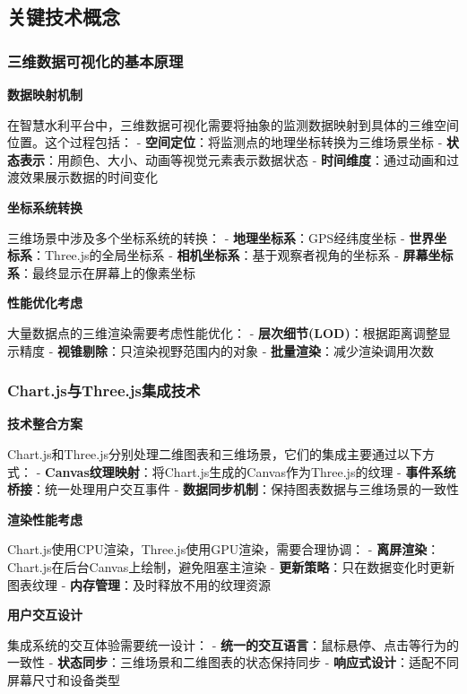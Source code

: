 \subsection{关键技术概念}\label{ux5173ux952eux6280ux672fux6982ux5ff5}

\subsubsection{三维数据可视化的基本原理}\label{ux4e09ux7ef4ux6570ux636eux53efux89c6ux5316ux7684ux57faux672cux539fux7406}

\textbf{数据映射机制}

在智慧水利平台中，三维数据可视化需要将抽象的监测数据映射到具体的三维空间位置。这个过程包括： - \textbf{空间定位}：将监测点的地理坐标转换为三维场景坐标 - \textbf{状态表示}：用颜色、大小、动画等视觉元素表示数据状态 - \textbf{时间维度}：通过动画和过渡效果展示数据的时间变化

\textbf{坐标系统转换}

三维场景中涉及多个坐标系统的转换： - \textbf{地理坐标系}：GPS经纬度坐标 - \textbf{世界坐标系}：Three.js的全局坐标系 - \textbf{相机坐标系}：基于观察者视角的坐标系 - \textbf{屏幕坐标系}：最终显示在屏幕上的像素坐标

\textbf{性能优化考虑}

大量数据点的三维渲染需要考虑性能优化： - \textbf{层次细节(LOD)}：根据距离调整显示精度 - \textbf{视锥剔除}：只渲染视野范围内的对象 - \textbf{批量渲染}：减少渲染调用次数

\subsubsection{Chart.js与Three.js集成技术}\label{chart.jsux4e0ethree.jsux96c6ux6210ux6280ux672f}

\textbf{技术整合方案}

Chart.js和Three.js分别处理二维图表和三维场景，它们的集成主要通过以下方式： - \textbf{Canvas纹理映射}：将Chart.js生成的Canvas作为Three.js的纹理 - \textbf{事件系统桥接}：统一处理用户交互事件 - \textbf{数据同步机制}：保持图表数据与三维场景的一致性

\textbf{渲染性能考虑}

Chart.js使用CPU渲染，Three.js使用GPU渲染，需要合理协调： - \textbf{离屏渲染}：Chart.js在后台Canvas上绘制，避免阻塞主渲染 - \textbf{更新策略}：只在数据变化时更新图表纹理 - \textbf{内存管理}：及时释放不用的纹理资源

\textbf{用户交互设计}

集成系统的交互体验需要统一设计： - \textbf{统一的交互语言}：鼠标悬停、点击等行为的一致性 - \textbf{状态同步}：三维场景和二维图表的状态保持同步 - \textbf{响应式设计}：适配不同屏幕尺寸和设备类型

